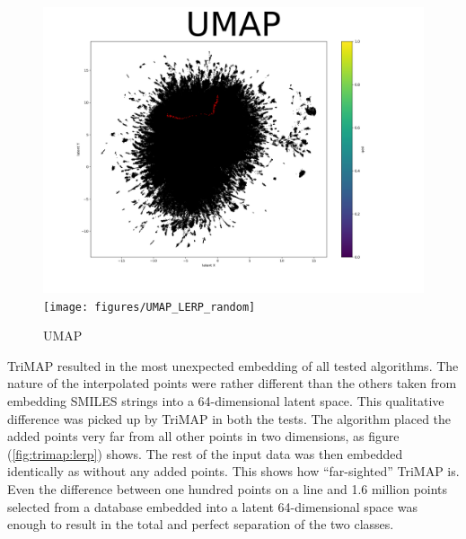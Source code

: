 
\begin{figure}[h]
	\centering
	\includegraphics[width=0.5\columnwidth]{figures/UMAP_LERP_coxib}
	\texttt{[image: figures/UMAP\_LERP\_random]}
	\caption{UMAP}
	\label{fig:umap:lerp}
\end{figure}

TriMAP resulted in the most unexpected embedding of all tested algorithms. The nature of the interpolated points were rather different than the others taken from embedding SMILES strings into a 64-dimensional latent space. This qualitative difference was picked up by TriMAP in both the tests. The algorithm placed the added points very far from all other points in two dimensions, as figure (\ref{fig:trimap:lerp}) shows. The rest of the input data was then embedded identically as without any added points. This shows how ``far-sighted'' TriMAP is. Even the difference between one hundred points on a line and 1.6 million points selected from a database embedded into a latent 64-dimensional space was enough to result in the total and perfect separation of the two classes.

